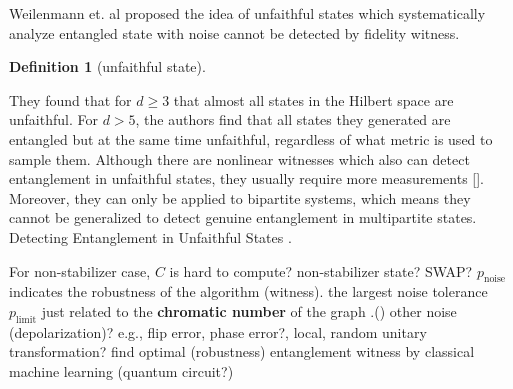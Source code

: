 \documentclass[
aps,
pra,
floatfix,
]{revtex4-2}
\theoremstyle{plain}
\newtheorem{question}{Question}
\theoremstyle{definition}
\newtheorem{definition}{Definition}
\newtheorem{remark}{Remark}
\newcommand{\noise}{\text{noise}}
\newcommand{\dm}{\rho}
\begin{document}
Weilenmann et. al \cite{weilenmannEntanglementDetectionMeasuring2020} proposed the idea of unfaithful states which systematically analyze entangled state with noise cannot be detected by fidelity witness.
\cite{guhneGeometryFaithfulEntanglement2021} \cite{riccardiExploringRelationshipFaithfulness2021}
\cite{huOptimizedDetectionHighDimensional2021}
\begin{definition}[unfaithful state]\label{def:unfaithful_state}
\end{definition}
They found that for $d \ge 3$ that almost all states in the Hilbert space are unfaithful. 
For $d > 5$, the authors find that all states they generated are entangled but at the same time unfaithful, regardless of what metric is used to sample them.
Although there are nonlinear witnesses which also can detect entanglement in unfaithful states, they usually require more measurements [].
Moreover, they can only be applied to bipartite systems, which means they cannot be generalized to detect genuine entanglement in multipartite states.
Detecting Entanglement in Unfaithful States \cite{zhanDetectingEntanglementUnfaithful2021}.

For non-stabilizer case, \cite{zhangEfficientEntanglementGeneration2021} \cite{zhuMachineLearningDerivedEntanglement2021}
$C$ is hard to compute? non-stabilizer state? SWAP?
$p_{\noise}$ indicates the robustness of the algorithm (witness).
	the largest noise tolerance $p_{\text{limit}}$ just related to the \textbf{chromatic number} of the graph \cite{zhouDetectingMultipartiteEntanglement2019}.()
	other noise (depolarization)? e.g., flip error, phase error?, local, random unitary transformation?
	find optimal (robustness) entanglement witness by classical machine learning (quantum circuit?)
\end{document}
